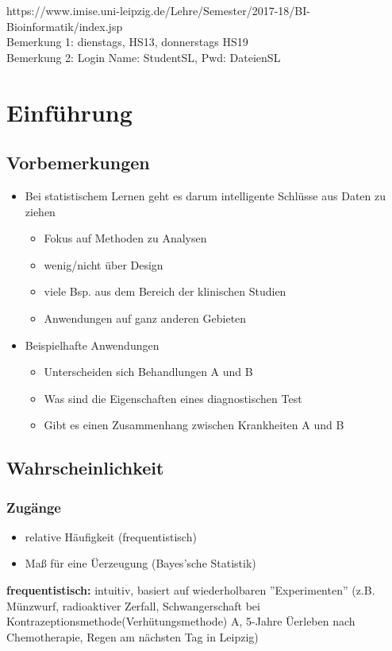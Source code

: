 \documentclass[../VorlesungMaster.tex]{subfiles}
\begin{document}
\begin{center}
		https://www.imise.uni-leipzig.de/Lehre/Semester/2017-18/BI-Bioinformatik/index.jsp\\
		Bemerkung 1: dienstags, HS13, donnerstags HS19\\
		Bemerkung 2: Login Name: StudentSL, Pwd: DateienSL
	\end{center}

	\section{Einführung}
	\subsection{Vorbemerkungen}
	\begin{itemize}
		\item Bei statistischem Lernen geht es darum intelligente Schlüsse aus Daten zu ziehen
		\begin{itemize}
			\item Fokus auf Methoden zu Analysen
			\item wenig/nicht über Design
			\item viele Bsp. aus dem Bereich der klinischen Studien
			\item Anwendungen auf ganz anderen Gebieten
		\end{itemize}
	\item Beispielhafte Anwendungen
	\begin{itemize}
		\item Unterscheiden sich Behandlungen A und B
		\item Was sind die Eigenschaften eines diagnostischen Test
		\item Gibt es einen Zusammenhang zwischen Krankheiten A und B
	\end{itemize}
	\end{itemize}
\subsection{Wahrscheinlichkeit}
\subsubsection{Zugänge}
\begin{itemize}
	\item relative Häufigkeit (frequentistisch)
	\item Maß für eine Üerzeugung (Bayes'sche Statistik)
\end{itemize}
\textbf{frequentistisch:} intuitiv, basiert auf wiederholbaren ''Experimenten'' (z.B. Münzwurf, radioaktiver Zerfall, Schwangerschaft bei Kontrazeptionsmethode(Verhütungsmethode) A, 5-Jahre Üerleben nach Chemotherapie, Regen am nächsten Tag in Leipzig)
\end{document}
